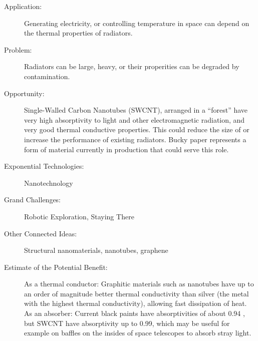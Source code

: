 \begin{description}  \item[Application:] Generating electricity, or controlling temperature  in space can depend on the thermal properties of radiators.
 
\item[Problem:] Radiators can be  large, heavy, or their properities can be degraded by contamination.
 
\item[Opportunity:] Single-Walled Carbon Nanotubes (SWCNT), arranged in a ``forest'' have very high  absorptivity to light and other electromagnetic radiation, and very good  thermal conductive properties. This could reduce the size of or  increase the performance of existing radiators. Bucky paper  \cite{Wang2008, nanolab, Wardle2008}  represents a form of material currently in production that could serve  this role.
 
\item[Exponential Technologies:]  Nanotechnology
 
\item[Grand Challenges:] Robotic  Exploration, Staying There
 
\item[Other Connected Ideas:]  Structural nanomaterials, nanotubes, graphene
 
\item[Estimate of the Potential  Benefit:] As a thermal conductor: Graphitic materials such as nanotubes  have up to an order of magnitude better thermal conductivity than silver  (the metal with the highest thermal conductivity), allowing fast  dissipation of heat. As an absorber: Current black paints have  absorptivities of about 0.94 \cite{solaracfaq}, but SWCNT have absorptivity up to  0.99, which may be useful for example on baffles on the insides of space  telescopes to absorb stray light.
 

\end{description}

